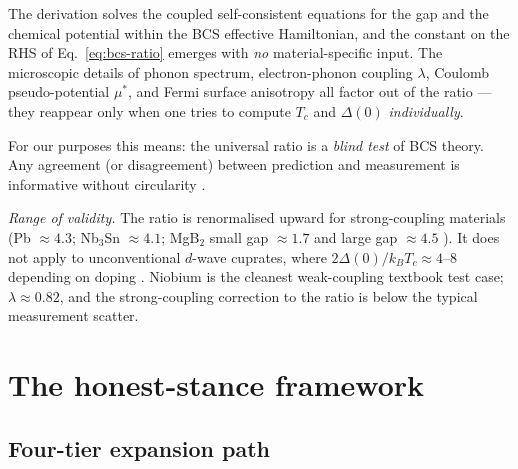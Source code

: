 \documentclass[11pt,a4paper]{article}
\begin{document}
The derivation \cite[Ch.~3]{tinkham1996} solves the coupled
self-consistent equations for the gap and the chemical potential
within the BCS effective Hamiltonian, and the constant on the RHS of
Eq.~\eqref{eq:bcs-ratio} emerges with \emph{no} material-specific
input. The microscopic details of phonon spectrum, electron-phonon
coupling \(\lambda\), Coulomb pseudo-potential \(\mu^{*}\), and Fermi
surface anisotropy all factor out of the ratio --- they reappear only
when one tries to compute \(T_{c}\) and \(\Delta(0)\) \emph{individually}.

For our purposes this means: the universal ratio is a \emph{blind
test} of BCS theory. Any agreement (or disagreement) between
prediction and measurement is informative without circularity
\cite[Ch.~4 \S 3]{poole2007handbook}.

\medskip
\noindent\emph{Range of validity.} The ratio is renormalised upward
for strong-coupling materials (Pb \(\approx 4.3\); Nb$_3$Sn \(\approx 4.1\);
MgB$_2$ small gap \(\approx 1.7\) and large gap \(\approx 4.5\)
\cite{souma2003mgb2_arpes}). It does not apply to unconventional
$d$-wave cuprates, where \(2\Delta(0)/k_{B}T_{c} \approx 4\text{--}8\)
depending on doping \cite{damascelli2003cuprates}.
Niobium is the cleanest weak-coupling textbook test case;
\(\lambda \approx 0.82\), and the strong-coupling correction to the
ratio is below the typical measurement scatter.

\section{The honest-stance framework}
\label{sec:framework}

\subsection{Four-tier expansion path}
\end{document}
